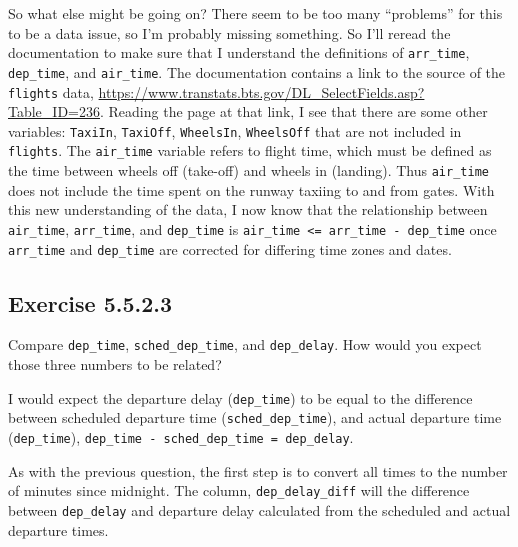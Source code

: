 \documentclass[]{book}
\theoremstyle{plain}
\theoremstyle{remark}
\begin{document}
So what else might be going on? There seem to be too many ``problems''
for this to be a data issue, so I'm probably missing something. So I'll
reread the documentation to make sure that I understand the definitions
of \texttt{arr\_time}, \texttt{dep\_time}, and \texttt{air\_time}. The
documentation contains a link to the source of the \texttt{flights}
data,
\url{https://www.transtats.bts.gov/DL_SelectFields.asp?Table_ID=236}.
Reading the page at that link, I see that there are some other
variables: \texttt{TaxiIn}, \texttt{TaxiOff}, \texttt{WheelsIn},
\texttt{WheelsOff} that are not included in \texttt{flights}. The
\texttt{air\_time} variable refers to flight time, which must be defined
as the time between wheels off (take-off) and wheels in (landing). Thus
\texttt{air\_time} does not include the time spent on the runway taxiing
to and from gates. With this new understanding of the data, I now know
that the relationship between \texttt{air\_time}, \texttt{arr\_time},
and \texttt{dep\_time} is
\texttt{air\_time\ \textless{}=\ arr\_time\ -\ dep\_time} once
\texttt{arr\_time} and \texttt{dep\_time} are corrected for differing
time zones and dates.

\hypertarget{exercise-5.5.2.3}{%
\subsection*{\texorpdfstring{Exercise
{5.5.2.3}}{Exercise 5.5.2.3}}\label{exercise-5.5.2.3}}

Compare \texttt{dep\_time}, \texttt{sched\_dep\_time}, and
\texttt{dep\_delay}. How would you expect those three numbers to be
related?

I would expect the departure delay (\texttt{dep\_time}) to be equal to
the difference between scheduled departure time
(\texttt{sched\_dep\_time}), and actual departure time
(\texttt{dep\_time}),
\texttt{dep\_time\ -\ sched\_dep\_time\ =\ dep\_delay}.

As with the previous question, the first step is to convert all times to
the number of minutes since midnight. The column,
\texttt{dep\_delay\_diff} will the difference between
\texttt{dep\_delay} and departure delay calculated from the scheduled
and actual departure times.
\end{document}
